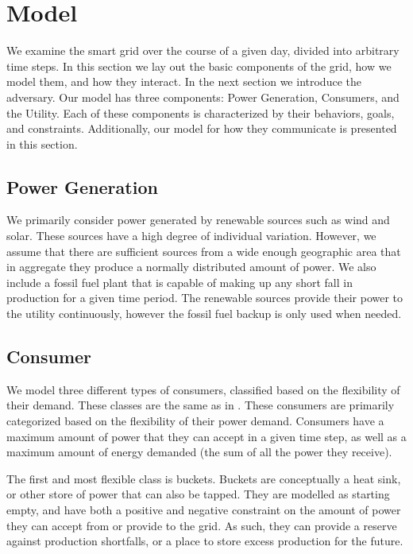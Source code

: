 \documentclass[conference]{IEEEtran}
\begin{document}
\section{Model}
\label{Model}

We examine the smart grid over the course of a given day, divided into arbitrary time steps.  In this section we lay out the basic components of the grid, how we model them, and how they interact.  In the next section we introduce the adversary.  Our model has three components: Power Generation, Consumers, and the Utility.  Each of these components is characterized by their behaviors, goals, and constraints.  Additionally, our model for how they communicate is presented in this section.  

\subsection{Power Generation}
\label{Power Generation}

We primarily consider power generated by renewable sources such as wind and solar.  These sources have a high degree of individual variation.  However, we assume that there are sufficient sources from a wide enough geographic area that in aggregate they produce a normally distributed amount of power.  We also include a fossil fuel plant that is capable of making up any short fall in production for a given time period.  The renewable sources provide their power to the utility continuously, however the fossil fuel backup is only used when needed.

\subsection{Consumer}
\label{Consumer}

We model three different types of consumers, classified based on the flexibility of their demand.  These classes are the same as in \cite{petersen2013taxonomy}.  These consumers are primarily categorized based on the flexibility of their power demand.  Consumers have a maximum amount of power that they can accept in a given time step, as well as a maximum amount of energy demanded (the sum of all the power they receive).

The first and most flexible class is buckets.  Buckets are conceptually a heat sink, or other store of power that can also be tapped.  They are modelled as starting empty, and have both a positive and negative constraint on the amount of power they can accept from or provide to the grid.  As such, they can provide a reserve against production shortfalls, or a place to store excess production for the future.
\end{document}
